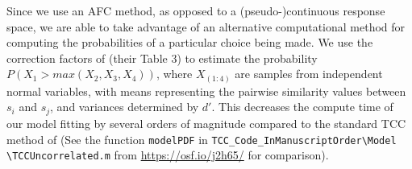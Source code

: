 Since we use an AFC method, as opposed to a (pseudo-)continuous response space, we are able to take advantage of an alternative computational method for computing the probabilities of a particular choice being made. 
We use the correction factors of \citet{mcgraw_common_1992} (their Table 3) to estimate the probability $P(X_1>max(X_2,X_3,X_4 ))$, where $X_(1:4)$ are samples from independent normal variables, with means representing the pairwise similarity values between $s_i$ and $s_j$, and variances determined by $d'$. 
This decreases the compute time of our model fitting by several orders of magnitude compared to the standard TCC method of \citet{schurgin_psychophysical_2020} (See the function \verb|modelPDF| in \verb|TCC_Code_InManuscriptOrder|\verb|\Model| \verb|\TCCUncorrelated.m| from \url{https://osf.io/j2h65/} for comparison).






